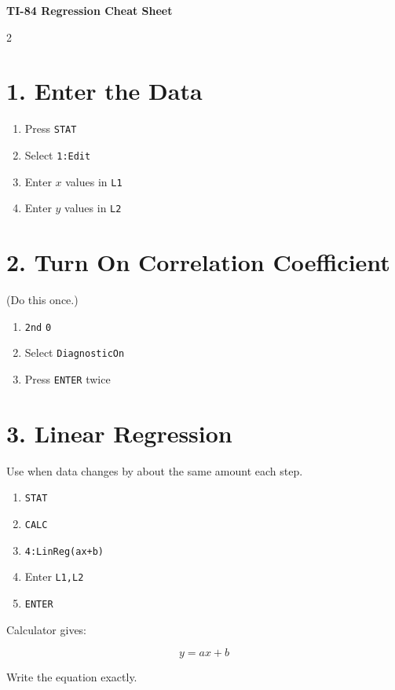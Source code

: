 \documentclass[10pt]{article}
\begin{document}
\begin{center}
{\Large\textbf{TI-84 Regression Cheat Sheet}}
\end{center}

\begin{multicols}{2}

\section*{1. Enter the Data}

\begin{enumerate}
\item Press \texttt{STAT}
\item Select \texttt{1:Edit}
\item Enter $x$ values in \texttt{L1}
\item Enter $y$ values in \texttt{L2}
\end{enumerate}

\section*{2. Turn On Correlation Coefficient}

(Do this once.)

\begin{enumerate}
\item \texttt{2nd} \texttt{0}
\item Select \texttt{DiagnosticOn}
\item Press \texttt{ENTER} twice
\end{enumerate}

\section*{3. Linear Regression}

Use when data changes by about the same amount each step.

\begin{enumerate}
\item \texttt{STAT}
\item \texttt{CALC}
\item \texttt{4:LinReg(ax+b)}
\item Enter \texttt{L1,L2}
\item \texttt{ENTER}
\end{enumerate}

Calculator gives:

\[
y=ax+b
\]

Write the equation exactly.


\end{multicols}
\end{document}
